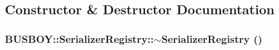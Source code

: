 \subsection{Constructor \& Destructor Documentation}
\hypertarget{classBUSBOY_1_1SerializerRegistry_a778ef3cd8813fe5cfb9679086e7024ec}{
\subsubsection[{$\sim$SerializerRegistry}]{\setlength{\rightskip}{0pt plus 5cm}BUSBOY::SerializerRegistry::$\sim$SerializerRegistry ()}}
\label{classBUSBOY_1_1SerializerRegistry_a778ef3cd8813fe5cfb9679086e7024ec}


